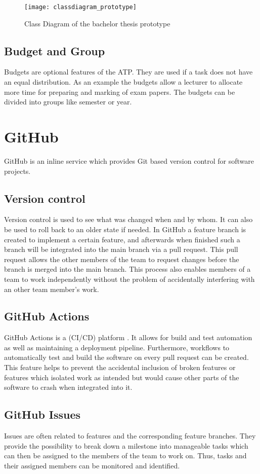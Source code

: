 \begin{figure}[H]
	\centering
	\texttt{[image: classdiagram\_prototype]}
	\caption{Class Diagram of the bachelor thesis prototype}
	\label{figure3}
\end{figure}

\subsection{Budget and Group}
Budgets are optional features of the ATP. They are used if a task does not have an equal distribution. As an example the budgets allow a lecturer to allocate more time for preparing and marking of exam papers. The budgets can be divided into groups like semester or year.

\section{GitHub} \label{GitHub}
GitHub \cite{github_url} is an inline service which provides Git based version control for software projects.
\subsection{Version control}
Version control is used to see what was changed when and by whom. It can also be used to roll back to an older state if needed. In GitHub a feature branch is created to implement a certain feature, and afterwards when finished such a branch will be integrated into the main branch via a pull request. This pull request allows the other members of the team to request changes before the branch is merged into the main branch. This process also enables members of a team to work independently without the problem of accidentally interfering with an other team member's work.
\subsection{GitHub Actions}
GitHub Actions is a (CI/CD) platform \cite{github_actions_url}. It allows for build and test automation as well as maintaining a deployment pipeline. Furthermore, workflows to automatically test and build the software on every pull request can be created. This feature helps to prevent the accidental inclusion of broken features or features which isolated work as intended but would cause other parts of the software to crash when integrated into it.
\subsection{GitHub Issues}
Issues are often related to features and the corresponding feature branches. They provide the possibility to break down a milestone into manageable tasks which can then be assigned to the members of the team to work on. Thus, tasks and their assigned members can be monitored and identified. 

